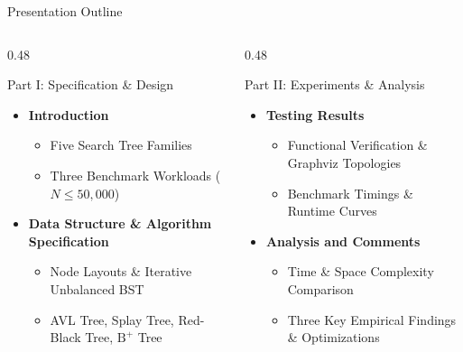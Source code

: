 \documentclass[aspectratio=169, 10pt, xcolor={x11names}]{beamer}
\begin{document}
\begin{frame}{Presentation Outline}
\begin{columns}[T,onlytextwidth]
\begin{column}{0.48\textwidth}
\begin{block}{Part I: Specification \& Design}
\begin{itemize}\setlength{\itemsep}{0.55em}
  \item \textbf{Introduction}
  \begin{itemize}\footnotesize
    \item Five Search Tree Families
    \item Three Benchmark Workloads ($N \le 50{,}000$)
  \end{itemize}
  \item \textbf{Data Structure \& Algorithm Specification}
  \begin{itemize}\footnotesize
    \item Node Layouts \& Iterative Unbalanced BST
    \item AVL Tree, Splay Tree, Red-Black Tree, $\text{B}^+$ Tree
  \end{itemize}
\end{itemize}
\end{block}
\end{column}
\begin{column}{0.48\textwidth}
\begin{exampleblock}{Part II: Experiments \& Analysis}
\begin{itemize}\setlength{\itemsep}{0.55em}
  \item \textbf{Testing Results}
  \begin{itemize}\footnotesize
    \item Functional Verification \& Graphviz Topologies
    \item Benchmark Timings \& Runtime Curves
  \end{itemize}
  \item \textbf{Analysis and Comments}
  \begin{itemize}\footnotesize
    \item Time \& Space Complexity Comparison
    \item Three Key Empirical Findings \& Optimizations
  \end{itemize}
\end{itemize}
\end{exampleblock}
\end{column}
\end{columns}
\end{frame}
\end{document}
